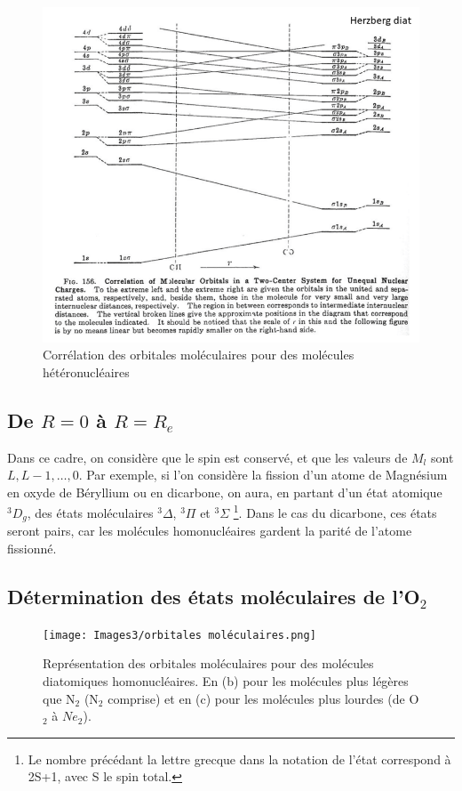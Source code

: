 \begin{figure}[htpb]
    \centering
    \includegraphics[scale=0.45]{Images3/Corrélation hétéronucléaire.png}
    \caption{Corrélation des orbitales moléculaires pour des molécules hétéronucléaires}
\end{figure}
\clearpage


\subsection{De $R=0$ à $R=R_e$}


Dans ce cadre, on considère que le spin est conservé, et que les valeurs de $M_l$ sont $L, L-1, \dots, 0$. Par exemple, si l'on considère la fission d'un atome de Magnésium en oxyde de Béryllium ou en dicarbone, on aura, en partant d'un état atomique $^3D_g$, des états moléculaires $^3\Delta$, $^3\Pi$ et $^3\Sigma$ \footnote{Le nombre précédant la lettre grecque dans la notation de l'état correspond à 2S+1, avec S le spin total.}. Dans le cas du dicarbone, ces états seront pairs, car les molécules homonucléaires gardent la parité de l'atome fissionné.


\subsection{Détermination des états moléculaires de l'\textnormal{O}$_2$}

\begin{figure}[htpb]
    \centering
    \texttt{[image: Images3/orbitales moléculaires.png]}
    \caption{Représentation des orbitales moléculaires pour des molécules diatomiques homonucléaires. En (b) pour les molécules plus légères que N$_2$ (N$_2$ comprise) et en (c) pour les molécules plus lourdes (de O$_2$ à $Ne_2$).}
    \label{fig:orbitales}
\end{figure}

